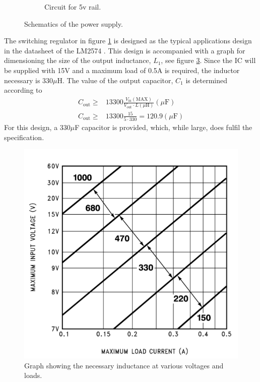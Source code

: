 \begin{figure}[h!]
\begin{subfigure}{\linewidth}
		\caption{Circuit for 5v rail.}
		\label{fig:psu5v}
	\end{subfigure}
	\caption{Schematics of the power supply.}
	\label{fig:psuschematic}
\end{figure}

The switching regulator in figure \ref{fig:psu5v} is designed as the typical applications design in the datasheet of the LM2574 \cite{lm2574}. This design is accompanied with a graph for dimensioning the size of the output inductance, $L_1$, see figure \ref{fig:inductorselect}. Since the IC will be supplied with 15V and a maximum load of 0.5A is required, the inductor necessary is 330$\mu$H. The value of the output capacitor, $C_1$ is determined according to 
\begin{eqnarray}
	C_\text{out}\geq&13300\frac{V_\text{in}(\text{MAX})}{V_\text{out}\cdot L(\mu\text{H})}(\mu\text{F})\\
	C_\text{out}\geq&13300\frac{15}{5\cdot 330} = 120.9(\mu\text{F})
\end{eqnarray} 
For this design, a 330$\mu$F capacitor is provided, which, while large, does fulfil the specification.
\begin{figure}[h!]
	\centering
	\includegraphics[width=.6\linewidth]{images/inductorselector}
	\caption{Graph showing the necessary inductance at various voltages and loads.}
	\label{fig:inductorselect}
\end{figure}
\\~\\

